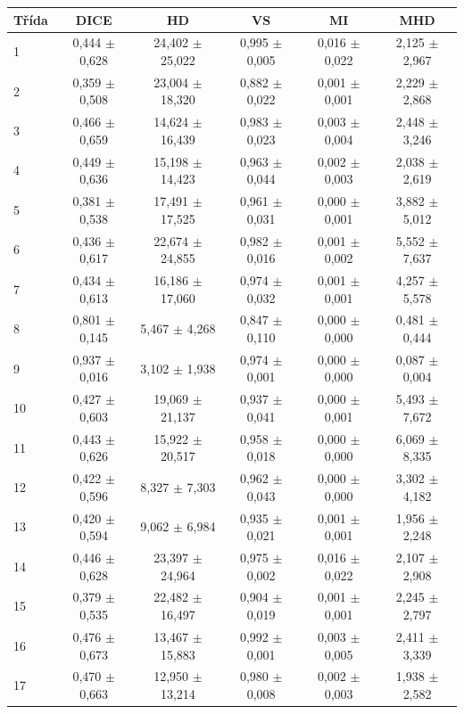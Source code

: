 \begin{tabular}{l c c c c c}
 \hline
Třída & DICE & HD & VS & MI & MHD \\ \hline
1 & 0,444 $\pm$ 0,628 & 24,402 $\pm$ 25,022 & 0,995 $\pm$ 0,005 & 0,016 $\pm$ 0,022 & 2,125 $\pm$ 2,967 \\
2 & 0,359 $\pm$ 0,508 & 23,004 $\pm$ 18,320 & 0,882 $\pm$ 0,022 & 0,001 $\pm$ 0,001 & 2,229 $\pm$ 2,868 \\
3 & 0,466 $\pm$ 0,659 & 14,624 $\pm$ 16,439 & 0,983 $\pm$ 0,023 & 0,003 $\pm$ 0,004 & 2,448 $\pm$ 3,246 \\
4 & 0,449 $\pm$ 0,636 & 15,198 $\pm$ 14,423 & 0,963 $\pm$ 0,044 & 0,002 $\pm$ 0,003 & 2,038 $\pm$ 2,619 \\
5 & 0,381 $\pm$ 0,538 & 17,491 $\pm$ 17,525 & 0,961 $\pm$ 0,031 & 0,000 $\pm$ 0,001 & 3,882 $\pm$ 5,012 \\
6 & 0,436 $\pm$ 0,617 & 22,674 $\pm$ 24,855 & 0,982 $\pm$ 0,016 & 0,001 $\pm$ 0,002 & 5,552 $\pm$ 7,637 \\
7 & 0,434 $\pm$ 0,613 & 16,186 $\pm$ 17,060 & 0,974 $\pm$ 0,032 & 0,001 $\pm$ 0,001 & 4,257 $\pm$ 5,578 \\
8 & 0,801 $\pm$ 0,145 & 5,467 $\pm$ 4,268 & 0,847 $\pm$ 0,110 & 0,000 $\pm$ 0,000 & 0,481 $\pm$ 0,444 \\
9 & 0,937 $\pm$ 0,016 & 3,102 $\pm$ 1,938 & 0,974 $\pm$ 0,001 & 0,000 $\pm$ 0,000 & 0,087 $\pm$ 0,004 \\
10 & 0,427 $\pm$ 0,603 & 19,069 $\pm$ 21,137 & 0,937 $\pm$ 0,041 & 0,000 $\pm$ 0,001 & 5,493 $\pm$ 7,672 \\
11 & 0,443 $\pm$ 0,626 & 15,922 $\pm$ 20,517 & 0,958 $\pm$ 0,018 & 0,000 $\pm$ 0,000 & 6,069 $\pm$ 8,335 \\
12 & 0,422 $\pm$ 0,596 & 8,327 $\pm$ 7,303 & 0,962 $\pm$ 0,043 & 0,000 $\pm$ 0,000 & 3,302 $\pm$ 4,182 \\
13 & 0,420 $\pm$ 0,594 & 9,062 $\pm$ 6,984 & 0,935 $\pm$ 0,021 & 0,001 $\pm$ 0,001 & 1,956 $\pm$ 2,248 \\
14 & 0,446 $\pm$ 0,628 & 23,397 $\pm$ 24,964 & 0,975 $\pm$ 0,002 & 0,016 $\pm$ 0,022 & 2,107 $\pm$ 2,908 \\
15 & 0,379 $\pm$ 0,535 & 22,482 $\pm$ 16,497 & 0,904 $\pm$ 0,019 & 0,001 $\pm$ 0,001 & 2,245 $\pm$ 2,797 \\
16 & 0,476 $\pm$ 0,673 & 13,467 $\pm$ 15,883 & 0,992 $\pm$ 0,001 & 0,003 $\pm$ 0,005 & 2,411 $\pm$ 3,339 \\
17 & 0,470 $\pm$ 0,663 & 12,950 $\pm$ 13,214 & 0,980 $\pm$ 0,008 & 0,002 $\pm$ 0,003 & 1,938 $\pm$ 2,582 \\

\end{tabular}
